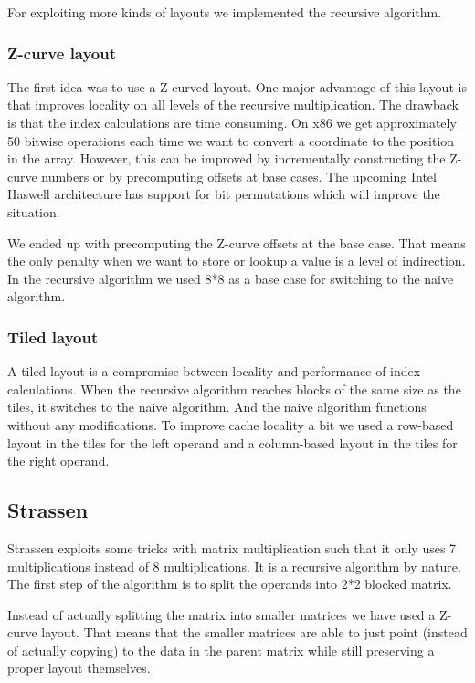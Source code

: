 For exploiting more kinds of layouts we implemented the recursive algorithm.

\subsubsection{Z-curve layout}

The first idea was to use a Z-curved layout. One major advantage of this layout is that improves locality on all levels of the recursive multiplication. The drawback is that the index calculations are time consuming. On x86 we get approximately 50 bitwise operations each time we want to convert a coordinate to the position in the array. However, this can be improved by incrementally constructing the Z-curve numbers or by precomputing offsets at base cases. The upcoming Intel Haswell architecture has support for bit permutations which will improve the situation.

We ended up with precomputing the Z-curve offsets at the base case. That means the only penalty when we want to store or lookup a value is a level of indirection. In the recursive algorithm we used 8*8 as a base case for switching to the naive algorithm.

\subsubsection{Tiled layout}

A tiled layout is a compromise between locality and performance of index calculations. When the recursive algorithm reaches blocks of the same size as the tiles, it switches to the naive algorithm. And the naive algorithm functions without any modifications. To improve cache locality a bit we used a row-based layout in the tiles for the left operand and a column-based layout in the tiles for the right operand.

\subsection{Strassen}

Strassen exploits some tricks with matrix multiplication such that it only uses 7 multiplications instead of 8 multiplications. It is a recursive algorithm by nature. The first step of the algorithm is to split the operands into 2*2 blocked matrix.

Instead of actually splitting the matrix into smaller matrices we have used a Z-curve layout. That means that the smaller matrices are able to just point (instead of actually copying) to the data in the parent matrix while still preserving a proper layout themselves.


